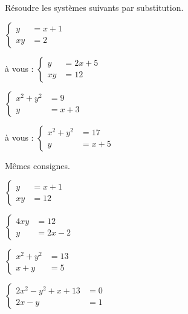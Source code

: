 \documentclass[main.tex]{subfiles}
\begin{document}
\begin{example}Résoudre les systèmes suivants par substitution.
	
\noindent
\parbox{0.5\linewidth}{
	$\begin{cases}
		y&=x+1\\
		xy&=2
	\end{cases}$
}
\hfill 
\parbox{0.5\linewidth}{
	à vous : $\begin{cases}
		y&=2x+5\\
		xy&=12
	\end{cases}$
} 	
\vfill  

\noindent
\parbox{0.5\linewidth}{
		$\begin{cases}
				x^2+y^2&=9\\
				y&=x+3
			\end{cases}$
	}
\hfill 
\parbox{0.5\linewidth}{
	à vous : 	$\begin{cases}
				x^2+y^2&=17\\
				y&=x+5
			\end{cases}$
	}	
\vfill  
\end{example} 
\begin{exercise}[renforcement] Mêmes consignes. 
	
\noindent
\parbox{0.21\linewidth}{
	$\begin{cases}
		y&=x+1\\
		xy&=12
	\end{cases}$
}
\hfill 
\parbox{0.24\linewidth}{
	$\begin{cases}
		4xy&=12\\
		 y&=2x-2
	\end{cases}$
}
\hfill 
\parbox{0.24\linewidth}{
	$\begin{cases}
		x^2+y^2&=13\\
		x+y&=5
	\end{cases}$
}
\hfill 
\parbox{0.27\linewidth}{
	$\begin{cases}
		2x^2-y^2+x+13&=0\\
		2x-y&=1
	\end{cases}$
}
\end{exercise} 
%	 
\newpage 
{}  
\pagestyle{scrheadings} %
\onehalfspacing
\end{document}
